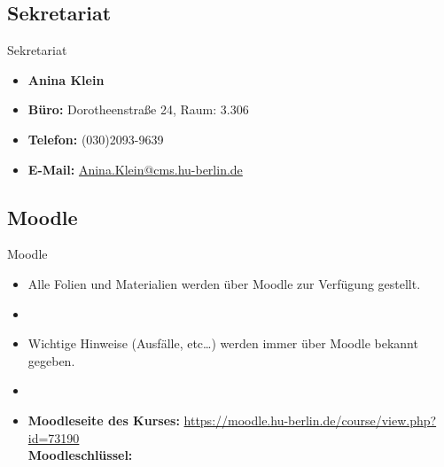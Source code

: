 %
\subsection{Sekretariat}

\begin{frame}{Sekretariat}
	
\begin{itemize}
	\item[] \textbf{Anina Klein}	
	\item \textbf{Büro:} Dorotheenstraße 24, Raum: 3.306
	\item \textbf{Telefon:} (030)2093-9639
	\item \textbf{E-Mail:} \href{mailto:Anina.Klein@cms.hu-berlin.de}{Anina.Klein@cms.hu-berlin.de}
\end{itemize}	

\end{frame}



%
\subsection{Moodle}	

\begin{frame}{Moodle}

\begin{itemize}
	\item Alle Folien und Materialien werden über Moodle zur Verfügung gestellt.
	\item[]
	\item Wichtige Hinweise (Ausfälle, etc\dots) werden immer über Moodle bekannt gegeben.
	\item[]
	\item \textbf{Moodleseite des Kurses:} \url{https://moodle.hu-berlin.de/course/view.php?id=73190}\\
	\textbf{Moodleschlüssel:} %
\end{itemize}		

\end{frame}

